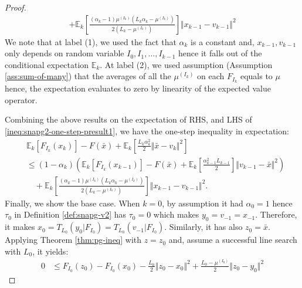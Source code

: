 \documentclass[12pt]{article}
\begin{document}
\begin{proof}
{\begin{align*}
                    + \mathbb E_k\left[
                        \frac{(\alpha_k - 1)\mu^{(I_k)}\left(L_k\alpha_k - \mu^{(I_k)}\right)}{2\left(L_k - \mu^{(I_k)}\right)}
                    \right]\Vert x_{k - 1} - v_{k - 1} \Vert^2
            \end{align*}
            }
            We note that at label (1), we used the fact that $\alpha_k$ is a constant and, $x_{k - 1}, v_{k - 1}$ only depends on random variable $I_0, I_1, \ldots, I_{k - 1}$ hence it falls out of the conditional expectation $\mathbb E_k$. 
            At label (2), we used assumption (Assumption \ref{ass:sum-of-many}) that the averages of all the $\mu^{(I_k)}$ on each $F_{I_k}$ equals to $\mu$ hence, the expectation evaluates to zero by linearity of the expected value operator. 
            \par
            Combining the above results on the expectation of RHS, and LHS of \eqref{ineq:snapg2-one-step-presult1}, we have the one-step inequality in expectation: 
            \begin{align*}
                & \mathbb E_k\left[F_{I_k}(x_{k})\right] 
                - F(\bar x) 
                + \mathbb E_k\left[
                    \frac{L_k\alpha_k^2}{2}\Vert \bar x - v_k\Vert^2 
                \right]
                \\
                &\le 
                (1 - \alpha_k)\left(
                        \mathbb E_k \left[F_{I_k}(x_{k - 1})\right] 
                        - F(\bar x)
                        + \mathbb E_k \left[\frac{\alpha_{k - 1}^2L_{k - 1}}{2}\right]\Vert v_{k - 1} - \bar x\Vert^2
                \right)
                    \\ &\quad 
                    + \mathbb E_k\left[
                        \frac{(\alpha_k - 1)\mu^{(I_k)}\left(L_k\alpha_k - \mu^{(I_k)}\right)}{2\left(L_k - \mu^{(I_k)}\right)}
                    \right]\Vert x_{k - 1} - v_{k - 1} \Vert^2. 
            \end{align*}
            Finally, we show the base case. 
            When $k = 0$, by assumption it had $\alpha_0 = 1$ hence $\tau_0$ in Definition \ref{def:snapg-v2} has $\tau_0 = 0$ which makes $y_0 = v_{- 1} = x_{-1}$. 
            Therefore, it makes $x_0 = T_{L_0}(y_0 | F_{I_0}) = T_{L_0}(v_{-1} | F_{I_0})$. 
            Similarly, it has also $z_0 = \bar x$.
            Applying Theorem \ref{thm:pg-ineq} with $z = z_0$ and, assume a successful line search with $L_0$, it yields: 
            \begin{align*}
                0 &\le F_{I_0}(z_0) - F_{I_0}(x_0) - \frac{L_0}{2}\Vert z_0 - x_0\Vert^2 + \frac{L_0 - \mu^{(I_0)}}{2}\Vert z_0 - y_0\Vert^2

\end{align*}
\end{proof}
\end{document}
